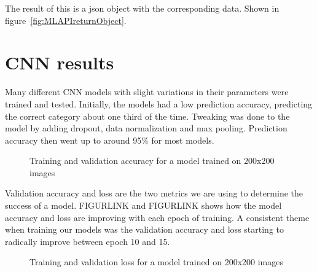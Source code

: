 The result of this is a json object with the corresponding data.
Shown in figure~\ref{fig:MLAPIreturnObject}.

\section{CNN results}\label{sec:cnn-results}
Many different CNN models with slight variations in their parameters were trained and tested.
Initially, the models had a low prediction accuracy, predicting the correct category about one third of the time.
Tweaking was done to the model by adding dropout, data normalization and max pooling.
Prediction accuracy then went up to around 95\% for most models.

\begin{figure}[h]
    \caption{Training and validation accuracy for a model trained on 200x200 images}
    \label{fig:200modelaccuracy}
\end{figure}
\clearpage
Validation accuracy and loss are the two metrics we are using to determine the success of a model.
FIGURLINK and FIGURLINK shows how the model accuracy and loss are improving with each epoch of training.
A consistent theme when training our models was the validation accuracy and loss starting to radically improve between epoch 10 and 15.

\begin{figure}[h]
    \caption{Training and validation loss for a model trained on 200x200 images}
    \label{fig:200modelloss}
\end{figure}



